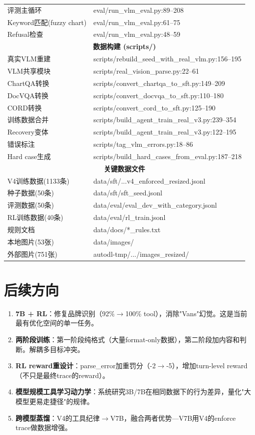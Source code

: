 \documentclass[fontset=none,11pt,a4paper]{ctexart}
\begin{document}
{\begin{longtable}{lp{7cm}}
评测主循环 & eval/run\_vlm\_eval.py:89--208 \\
Keyword匹配(fuzzy chart) & eval/run\_vlm\_eval.py:61--75 \\
Refusal检查 & eval/run\_vlm\_eval.py:48--59 \\
\midrule
\multicolumn{2}{c}{\textbf{数据构建 (scripts/)}} \\
真实VLM重建 & scripts/rebuild\_seed\_with\_real\_vlm.py:156--195 \\
VLM共享模块 & scripts/real\_vision\_parse.py:22--61 \\
ChartQA转换 & scripts/convert\_chartqa\_to\_sft.py:149--209 \\
DocVQA转换 & scripts/convert\_docvqa\_to\_sft.py:110--180 \\
CORD转换 & scripts/convert\_cord\_to\_sft.py:125--190 \\
训练数据合并 & scripts/build\_agent\_train\_real\_v3.py:239--354 \\
Recovery变体 & scripts/build\_agent\_train\_real\_v3.py:122--195 \\
错误标注 & scripts/tag\_vlm\_errors.py:18--86 \\
Hard case生成 & scripts/build\_hard\_cases\_from\_eval.py:187--218 \\
\midrule
\multicolumn{2}{c}{\textbf{关键数据文件}} \\
V4训练数据(1133条) & data/sft/...v4\_enforced\_resized.jsonl \\
种子数据(50条) & data/sft/sft\_seed.jsonl \\
评测数据(50条) & data/eval/eval\_dev\_with\_category.jsonl \\
RL训练数据(40条) & data/eval/rl\_train.jsonl \\
规则文档 & data/docs/*\_rules.txt \\
本地图片(53张) & data/images/ \\
外部图片(751张) & autodl-tmp/.../images\_resized/ \\
\bottomrule
\end{longtable}}

\section{后续方向}

\begin{enumerate}[nosep]
    \item \textbf{7B + RL}：修复品牌识别（92\%$\to$100\% tool），消除"Vans"幻觉。这是当前最有优化空间的单一任务。
    \item \textbf{两阶段训练}：第一阶段纯格式（大量format-only数据），第二阶段加内容和判断。解耦多目标冲突。
    \item \textbf{RL reward重设计}：parse\_error加重罚分（-2$\to$-5），增加turn-level reward（不只是最终trace的reward）。
    \item \textbf{模型规模工具学习动力学}：系统研究3B/7B在相同数据下的行为差异，量化"大模型更易走捷径"的规律。
    \item \textbf{跨模型蒸馏}：V4的工具纪律$\to$V7B，融合两者优势---V7B用V4的enforce trace做数据增强。
\end{enumerate}
\end{document}
